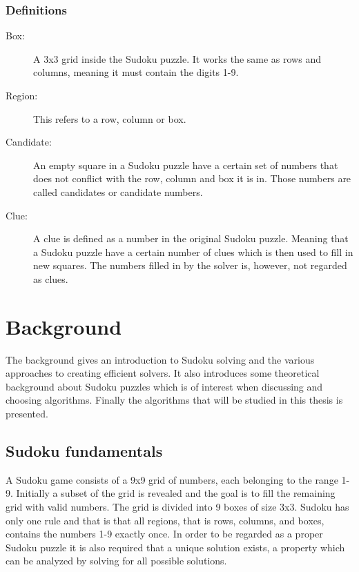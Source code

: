 \documentclass[a4paper,11pt]{kth-mag}
\begin{document}
\subsection{Definitions}
\begin{description}
    \item[Box:] A 3x3 grid inside the Sudoku puzzle. It works the same as rows and columns, meaning it must contain the digits 1-9.
    \item[Region:] This refers to a row, column or box.
    \item[Candidate:] An empty square in a Sudoku puzzle have a certain set of numbers that does not conflict with the row, column and box it is in. Those numbers are called candidates or candidate numbers.
    \item[Clue:] A clue is defined as a number in the original Sudoku puzzle. Meaning that a Sudoku puzzle have a certain number of clues which is then used to fill in new squares. The numbers filled in by the solver is, however, not regarded as clues.
\end{description}

\chapter{Background}
\label{sec:background}
The background gives an introduction to Sudoku solving and the various approaches to creating efficient solvers. It also introduces some theoretical background about Sudoku puzzles which is of interest when discussing and choosing algorithms. Finally the algorithms that will be studied in this thesis is presented.

\FloatBarrier
\section{Sudoku fundamentals}
A Sudoku game consists of a 9x9 grid of numbers, each belonging to the range 1-9.
Initially a subset of the grid is revealed and the goal is to fill the remaining grid with valid numbers.
The grid is divided into 9 boxes of size 3x3.
Sudoku has only one rule and that is that all regions, that is rows, columns, and boxes, contains the numbers 1-9 exactly once.\cite{17clueProof}
In order to be regarded as a proper Sudoku puzzle it is also required that a unique solution exists, a property which can be analyzed by solving for all possible solutions.
\end{document}
